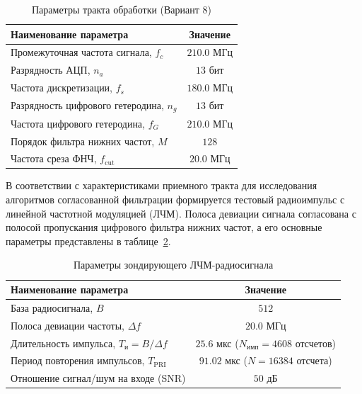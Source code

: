 \begin{table}[H]
\centering
\caption{Параметры тракта обработки (Вариант 8)}
\label{tab:param_dev}
\begin{tabular}{|l|c|}
\hline
\textbf{Наименование параметра} & \textbf{Значение} \\ \hline
Промежуточная частота сигнала, $f_c$ & $210.0$ МГц \\ \hline
Разрядность АЦП, $n_a$ & $13$ бит \\ \hline
Частота дискретизации, $f_s$ & $180.0$ МГц \\ \hline
Разрядность цифрового гетеродина, $n_g$ & $13$ бит \\ \hline
Частота цифрового гетеродина, $f_G$ & $210.0$ МГц \\ \hline
Порядок фильтра нижних частот, $M$ & $128$ \\ \hline
Частота среза ФНЧ, $f_{\text{cut}}$ & $20.0$ МГц \\ \hline
\end{tabular}
\end{table}

В соответствии с характеристиками приемного тракта для исследования алгоритмов согласованной фильтрации формируется тестовый радиоимпульс с линейной частотной модуляцией (ЛЧМ). Полоса девиации сигнала согласована с полосой пропускания цифрового фильтра нижних частот, а его основные параметры представлены в таблице~\ref{tab:param_sig}.

\begin{table}[H]
\centering
\caption{Параметры зондирующего ЛЧМ-радиосигнала}
\label{tab:param_sig}
\begin{tabular}{|l|c|}
\hline
\textbf{Наименование параметра} & \textbf{Значение} \\ \hline
База радиосигнала, $B$ & $512$ \\ \hline
Полоса девиации частоты, $\Delta f$ & $20.0$ МГц \\ \hline
Длительность импульса, $T_{\text{и}} = B / \Delta f$ & $25.6\text{ мкс}$ ($N_{\text{имп}} = 4608$ отсчетов) \\ \hline
Период повторения импульсов, $T_{\text{PRI}}$ & $91.02\text{ мкс}$ ($N = 16384$ отсчета) \\ \hline
Отношение сигнал/шум на входе (SNR) & $50$ дБ \\ \hline
\end{tabular}
\end{table}